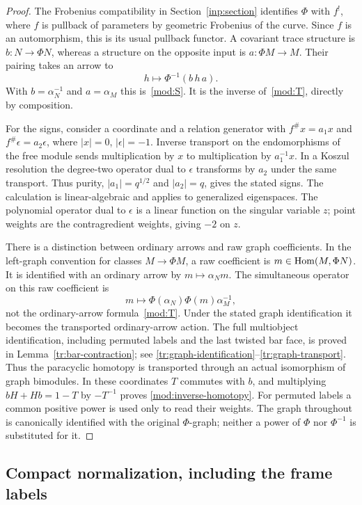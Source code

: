 \begin{proof}
The Frobenius compatibility in Section~\ref{inp:section} identifies
$\Phi$ with $f^!$, where $f$ is pullback of parameters by geometric
Frobenius of the curve. Since $f$ is an automorphism, this is its
usual pullback functor. A covariant trace structure is
$b:N\to\Phi N$, whereas a structure on the opposite input is
$a:\Phi M\to M$. Their pairing takes an arrow to
\[
 h\longmapsto\Phi^{-1}(b\,h\,a).
\]
With $b=\alpha_N^{-1}$ and $a=\alpha_M$ this is~\eqref{mod:S}.
It is the inverse of~\eqref{mod:T}, directly by composition.

For the signs, consider a coordinate and a relation generator with
$f^\#x=a_1x$ and $f^\#\epsilon=a_2\epsilon$, where
$|x|=0$, $|\epsilon|=-1$. Inverse transport on the endomorphisms of
the free module sends multiplication by $x$ to multiplication by
$a_1^{-1}x$. In a Koszul resolution the degree-two operator dual to
$\epsilon$ transforms by $a_2$ under the same transport. Thus
purity, $|a_1|=q^{1/2}$ and $|a_2|=q$, gives the stated signs.
The calculation is linear-algebraic and applies to generalized
eigenspaces. The polynomial operator dual to $\epsilon$ is a linear
function on the singular variable $z$; point weights are the
contragredient weights, giving $-2$ on $z$.

There is a distinction between ordinary arrows and raw graph
coefficients. In the left-graph convention for classes $M\to\Phi M$,
a raw coefficient is $m\in\operatorname{Hom}(M,\Phi N)$. It is identified with
an ordinary arrow by $m\mapsto\alpha_Nm$. The simultaneous operator on this
raw coefficient is
\[
 m\longmapsto\Phi(\alpha_N)\Phi(m)\alpha_M^{-1},
\]
not the ordinary-arrow formula~\eqref{mod:T}. Under the stated graph
identification it becomes the transported ordinary-arrow action.
The full multiobject identification, including permuted labels and
the last twisted bar face, is proved in
Lemma~\ref{tr:bar-contraction}; see
\eqref{tr:graph-identification}--\eqref{tr:graph-transport}.
Thus the paracyclic homotopy is transported through an actual
isomorphism of graph bimodules. In these coordinates $T$ commutes
with $b$, and multiplying $bH+Hb=1-T$ by $-T^{-1}$ proves
\eqref{mod:inverse-homotopy}. For permuted labels a common positive
power is used only to read their weights. The graph throughout is
canonically identified with the original $\Phi$-graph; neither a
power of $\Phi$ nor $\Phi^{-1}$ is substituted for it.
\end{proof}

\subsection{Compact normalization, including the frame labels}

